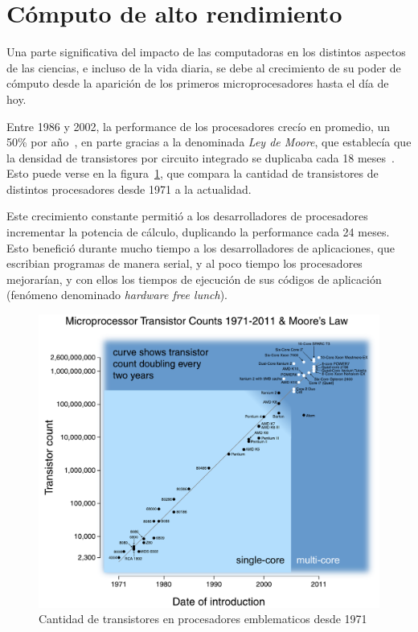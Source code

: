 \section{C\'omputo de alto rendimiento}

Una parte significativa del impacto de las computadoras en los distintos aspectos de las
ciencias, e incluso de la vida diaria, se debe al crecimiento de su
poder de c\'omputo desde la aparici\'on de los primeros microprocesadores hasta el
d\'ia de hoy.

Entre 1986 y 2002, la performance de los procesadores crec\'io en promedio, un 50\%
por a\~no~\cite{Pacheco}, en parte gracias a la denominada \textit{Ley de Moore}, que
establec\'ia que la densidad de transistores por circuito integrado se duplicaba
cada 18 meses~\cite{HennessyPatterson}. Esto puede verse en la figura~\ref{moore-law},
que compara la cantidad de transistores de distintos procesadores desde 1971 a la actualidad.

Este crecimiento constante permiti\'o a los desarrolladores de procesadores incrementar la potencia
de c\'alculo, duplicando la performance cada 24 meses. Esto benefici\'o durante mucho tiempo a los desarrolladores
de aplicaciones, que escribian programas de manera serial, y al poco tiempo los procesadores
mejorar\'ian, y con ellos los tiempos de ejecuci\'on de sus c\'odigos de aplicaci\'on (fen\'omeno denominado
\textit{hardware free lunch}).

\begin{figure}[htbp]
   \centering
   \includegraphics[width=\textwidth]{images/moore-law.pdf}
   \caption{Cantidad de transistores en procesadores emblematicos desde 1971}
   \label{moore-law}
\end{figure}

